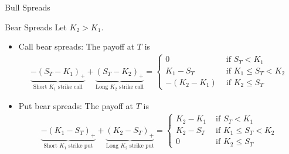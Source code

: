 \documentclass[10pt,handout]{beamer}
\theoremstyle{definition}
\begin{document}
\begin{frame}{Bull Spreads}
\begin{figure}[!htbp]
  \end{figure}
\end{frame}

\begin{frame}{Bear Spreads}
  Let $K_2 > K_1$.
  \begin{itemize}
    \item Call bear spreads: The payoff at $T$ is \vspace{-3mm}
      \begin{align*}
        \underbrace{-(S_T - K_1)_+}_{\text{Short }K_1\text{ strike call}} + \underbrace{(S_T - K_2)_+}_{\text{Long }K_2\text{ strike call}} = \begin{cases}0 & \text{ if } S_T < K_1\\ K_1 - S_T & \text{ if } K_1\leqslant S_T < K_2 \\ -(K_2 - K_1) & \text{ if } K_2\leqslant S_T \end{cases}
      \end{align*}
    \item Put bear spreads: The payoff at $T$ is \vspace{-3mm}
      \begin{align*}
        \underbrace{-(K_1 - S_T)_+}_{\text{Short }K_1\text{ strike put}} + \underbrace{(K_2 - S_T)_+}_{\text{Long }K_2\text{ strike put}} = \begin{cases}K_2 - K_1 & \text{ if } S_T < K_1\\ K_2 - S_T & \text{ if } K_1\leqslant S_T < K_2 \\ 0 & \text{ if } K_2\leqslant S_T \end{cases}
      \end{align*}
  \end{itemize}
  \begin{figure}[!htbp]
    \centering

\end{figure}
\end{frame}
\end{document}
